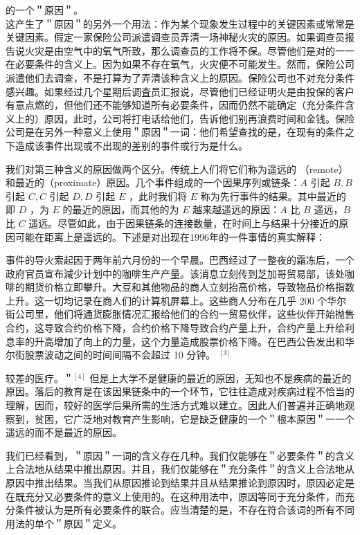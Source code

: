 的一个＂原因＂。\\
这产生了＂原因＂的另外一个用法：作为某个现象发生过程中的关键因素或常常是关键因素。假定一家保险公司派遣调查员弄清一场神秘火灾的原因。如果调查员报告说火灾是由空气中的氧气所致，那么调查员的工作将不保。尽管他们是对的一一在必要条件的含义上。因为如果不存在氧气，火灾便不可能发生。然而，保险公司派遣他们去调查，不是打算为了弄清该种含义上的原因。保险公司也不对充分条件感兴趣。如果经过几个星期后调査员汇报说，尽管他们已经证明火是由投保的客户有意点燃的，但他们还不能够知道所有必要条件，因而仍然不能确定（充分条件含义上的）原因，此时，公司将打电话给他们，告诉他们别再浪费时间和金钱。保险公司是在另外一种意义上使用＂原因＂一词：他们希望查找的是，在现有的条件之下造成该事件出现或不出现的差别的事件或行为是什么。

我们对第三种含义的原因做两个区分。传统上人们将它们称为遥远的 （remote）和最近的（proximate）原因。几个事件组成的一个因果序列或链条：$A$ 引起 $B, B$ 引起 $C, C$ 引起 $D, D$ 引起 $E$ ，此时我们将 $E$ 称为先行事件的结果。其中最近的即 $D$ ，为 $E$ 的最近的原因，而其他的为 $E$ 越来越遥远的原因：$A$ 比 $B$ 遥远，$B$ 比 $C$ 遥远。尽管如此，由于因果链条的连接数量，在时间上与结果十分接近的原因可能在距离上是遥远的。下述是对出现在1996年的一件事情的真实解释：

事件的导火索起因于两年前六月份的一个早晨。巴西经过了一整夜的霜冻后，一个政府官员宣布減少计划中的咖啡生产产量。该消息立刻传到芝加哥贸易部，该处咖啡的期货价格立即攀升。大豆和其他物品的商人立刻抬高价格，导致物品价格指数上升。这一切均记录在商人们的计算机屏幕上。这些商人分布在几乎 200 个华尔街公司里，他们将通货膨胀情况汇报给他们的合约一贸易伙伴，这些伙伴开始抛售合约，这导致合约价格下降，合约价格下降导致合约产量上升，合约产量上升给利息率的升高增加了向上的力量，这个力量造成股票价格下降。在巴西公告发出和华尔街股票波动之间的时间间隔不会超过 10 分钟。 ${ }^{[3]}$

较差的医疗。＂${ }^{[4]}$ 但是上大学不是健康的最近的原因，无知也不是疾病的最近的原因。落后的教育是在该因果链条中的一个环节，它往往造成对疾病过程不恰当的理解，因而，较好的医学后果所需的生活方式难以建立。因此人们普遍并正确地观察到，贫困，它广泛地对教育产生影响，它是缺乏健康的一个＂根本原因＂一一个遥远的而不是最近的原因。

我们已经看到，＂原因＂一词的含义存在几种。我们仅能够在＂必要条件＂的含义上合法地从结果中推出原因。并且，我们仅能够在＂充分条件＂的含义上合法地从原因中推出结果。当我们从原因推论到结果并且从结果推论到原因时，原因必定是在既充分又必要条件的意义上使用的。在这种用法中，原因等同于充分条件，而充分条件被认为是所有必要条件的联合。应当清楚的是，不存在符合该词的所有不同用法的单个＂原因＂定义。

